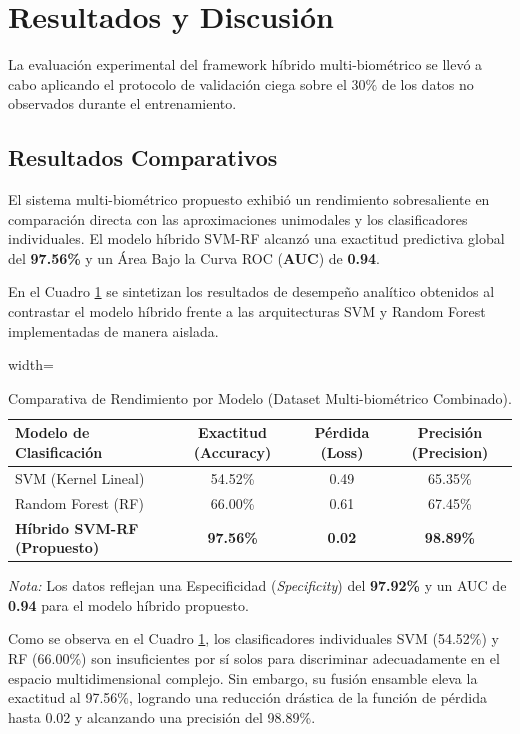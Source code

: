 \section{Resultados y Discusión}\label{sec:experimental}

La evaluación experimental del framework híbrido multi-biométrico se llevó a cabo aplicando el protocolo de validación ciega sobre el $30\%$ de los datos no observados durante el entrenamiento.

\subsection{Resultados Comparativos}
El sistema multi-biométrico propuesto exhibió un rendimiento sobresaliente en comparación directa con las aproximaciones unimodales y los clasificadores individuales. El modelo híbrido SVM-RF alcanzó una exactitud predictiva global del \textbf{97.56\%} y un Área Bajo la Curva ROC (\textbf{AUC}) de \textbf{0.94}.

En el Cuadro \ref{tab:model_comparison} se sintetizan los resultados de desempeño analítico obtenidos al contrastar el modelo híbrido frente a las arquitecturas SVM y Random Forest implementadas de manera aislada.

\begin{table}[h]
\centering
\caption{Comparativa de Rendimiento por Modelo (Dataset Multi-biométrico Combinado).}
\label{tab:model_comparison}
\begin{adjustbox}{width=\columnwidth}
\begin{tabular}{lccc}
\toprule
\textbf{Modelo de Clasificación} & \textbf{Exactitud (Accuracy)} & \textbf{Pérdida (Loss)} & \textbf{Precisión (Precision)} \\
\midrule
SVM (Kernel Lineal) & 54.52\% & 0.49 & 65.35\% \\
Random Forest (RF) & 66.00\% & 0.61 & 67.45\% \\
\textbf{Híbrido SVM-RF (Propuesto)} & \textbf{97.56\%} & \textbf{0.02} & \textbf{98.89\%} \\
\bottomrule
\end{tabular}
\end{adjustbox}
\vspace{0.2em}
{\footnotesize \textit{Nota:} Los datos reflejan una Especificidad (\textit{Specificity}) del \textbf{97.92\%} y un AUC de \textbf{0.94} para el modelo híbrido propuesto.}
\end{table}

Como se observa en el Cuadro \ref{tab:model_comparison}, los clasificadores individuales SVM (54.52\%) y RF (66.00\%) son insuficientes por sí solos para discriminar adecuadamente en el espacio multidimensional complejo. Sin embargo, su fusión ensamble eleva la exactitud al 97.56\%, logrando una reducción drástica de la función de pérdida hasta 0.02 y alcanzando una precisión del 98.89\%.

